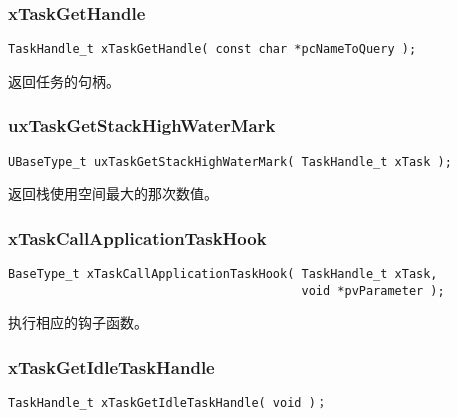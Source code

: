 \documentclass[12pt, a4paper]{article}
\begin{document}
\subsubsection {xTaskGetHandle}

\begin{lstlisting}[language={[ANSI]C},keywordstyle=\color{blue!70},commentstyle=\color{red!50!green!50!blue!50},frame=shadowbox, rulesepcolor=\color{red!20!green!20!blue!20}]
TaskHandle_t xTaskGetHandle( const char *pcNameToQuery );
\end{lstlisting}

返回任务的句柄。

\subsubsection {uxTaskGetStackHighWaterMark}

\begin{lstlisting}[language={[ANSI]C},keywordstyle=\color{blue!70},commentstyle=\color{red!50!green!50!blue!50},frame=shadowbox, rulesepcolor=\color{red!20!green!20!blue!20}]
UBaseType_t uxTaskGetStackHighWaterMark( TaskHandle_t xTask );
\end{lstlisting}

返回栈使用空间最大的那次数值。

\subsubsection {xTaskCallApplicationTaskHook}

\begin{lstlisting}[language={[ANSI]C},keywordstyle=\color{blue!70},commentstyle=\color{red!50!green!50!blue!50},frame=shadowbox, rulesepcolor=\color{red!20!green!20!blue!20}]
BaseType_t xTaskCallApplicationTaskHook( TaskHandle_t xTask, 
                                         void *pvParameter );
\end{lstlisting}

执行相应的钩子函数。

\subsubsection {xTaskGetIdleTaskHandle}

\begin{lstlisting}[language={[ANSI]C},keywordstyle=\color{blue!70},commentstyle=\color{red!50!green!50!blue!50},frame=shadowbox, rulesepcolor=\color{red!20!green!20!blue!20}]
TaskHandle_t xTaskGetIdleTaskHandle( void )；
\end{lstlisting}
\end{document}
